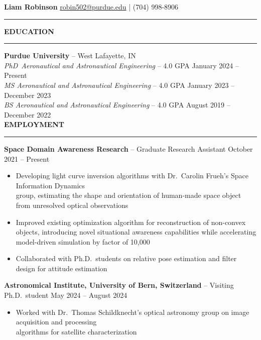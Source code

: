 \documentclass[11pt, a4paper]{article}
\newcommand{\sectiontitle}[1]{{\Large \textbf{#1}}\vspace{0.5em}\hrule\vspace{0.5em}}
\begin{document}
\thispagestyle{empty}

\sffamily
\renewcommand*{\bibfont}{\normalfont\normalsize\sffamily}

\noindent
\textbf{\huge Liam Robinson} \hfill \href{mailto:robin502@purdue.edu}{robin502@purdue.edu} | (704) 998-8906
\rule{\linewidth}{4pt}
\vspace{-0.5em}

\sectiontitle{EDUCATION}
\textbf{Purdue University} -- West Lafayette, IN \\
\textit{PhD\ Aeronautical and Astronautical Engineering} -- 4.0 GPA \hfill January 2024 -- Present \\
\textit{MS \hspace{1px} Aeronautical and Astronautical Engineering} -- 4.0 GPA \hfill January 2023 -- December 2023 \\
\textit{BS \hspace{3px} Aeronautical and Astronautical Engineering} -- 4.0 GPA \hfill August 2019 -- December 2022 \\

\sectiontitle{EMPLOYMENT}
\textbf{Space Domain Awareness Research} -- Graduate Research Assistant \hfill October 2021 -- Present
\begin{itemize}[noitemsep]
    \item Developing light curve inversion algorithms with Dr.\ Carolin Frueh's Space Information Dynamics \\group,
    estimating the shape and orientation of human-made space object from unresolved optical observations
    \item Improved existing optimization algorithm for reconstruction of non-convex objects, introducing novel
    situational awareness capabilities while accelerating model-driven simulation by factor of 10,000
    \item Collaborated with Ph.D.\ students on relative pose estimation and filter design for attitude estimation
\end{itemize}

\textbf{Astronomical Institute, University of Bern, Switzerland} -- Visiting Ph.D.\ student \hfill May 2024 -- August 2024
\begin{itemize}[noitemsep]
    \item Worked with Dr.\ Thomas Schildknecht's optical astronomy group on image acquisition and processing \\algorithms for satellite characterization
\end{itemize}
\end{document}
